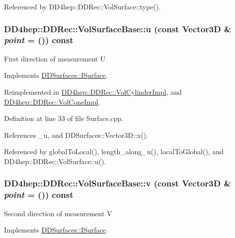 Referenced by DD4hep::DDRec::VolSurface::type().\hypertarget{class_d_d4hep_1_1_d_d_rec_1_1_vol_surface_base_a6b72381e54cf0c94ab56db4bdbc8b4a4}{
\subsubsection[{u}]{ DD4hep::DDRec::VolSurfaceBase::u (const {\bf Vector3D} \& {\em point} = {()}) const}}
\label{class_d_d4hep_1_1_d_d_rec_1_1_vol_surface_base_a6b72381e54cf0c94ab56db4bdbc8b4a4}
First direction of measurement U 

Implements \hyperlink{class_d_d_surfaces_1_1_i_surface_a09fd4aa43cc96d50b4b81b94107f7d8f}{DDSurfaces::ISurface}.

Reimplemented in \hyperlink{class_d_d4hep_1_1_d_d_rec_1_1_vol_cylinder_impl_a7c2990e721f48f65bd4fda4cfd00c976}{DD4hep::DDRec::VolCylinderImpl}, and \hyperlink{class_d_d4hep_1_1_d_d_rec_1_1_vol_cone_impl_ae3f99967ddeb67c1ad76414cea068395}{DD4hep::DDRec::VolConeImpl}.

Definition at line 33 of file Surface.cpp.

References \_\-u, and DDSurfaces::Vector3D::x().

Referenced by globalToLocal(), length\_\-along\_\-u(), localToGlobal(), and DD4hep::DDRec::VolSurface::u().\hypertarget{class_d_d4hep_1_1_d_d_rec_1_1_vol_surface_base_a0dd53eec9381d83d0632329223d0b24b}{
\subsubsection[{v}]{ DD4hep::DDRec::VolSurfaceBase::v (const {\bf Vector3D} \& {\em point} = {()}) const}}
\label{class_d_d4hep_1_1_d_d_rec_1_1_vol_surface_base_a0dd53eec9381d83d0632329223d0b24b}
Second direction of measurement V 

Implements \hyperlink{class_d_d_surfaces_1_1_i_surface_a61c9f2057ea0383b39ead13a147b2838}{DDSurfaces::ISurface}.

